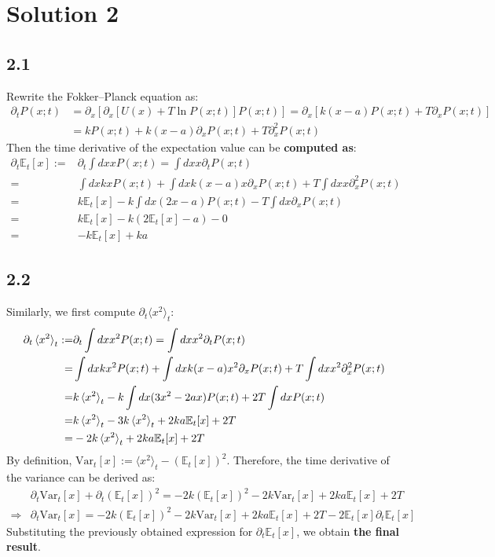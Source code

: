 \documentclass[11pt]{article}
\begin{document}
	\section*{Solution 2}
	\subsection*{2.1}
	Rewrite the Fokker--Planck equation as:
	\[
	\begin{aligned}
		\partial_t P(x;t) &= \partial_x\left[\partial_x\left[U(x) + T\ln P(x;t)\right]P(x;t)\right]=\partial_x\left[k(x-a)P(x;t)+T\partial_xP(x;t)\right]\\
		&=kP(x;t)+k(x-a)\partial_xP(x;t)+T\partial_x^2P(x;t)
	\end{aligned}
	\]
Then the time derivative of the expectation value can be \textbf{computed as}:
	\[
	\begin{aligned}
		\partial_t\mathbb{E}_t[x]:=&\partial_t\int dx xP(x;t)=\int dx x\partial_t P(x;t)\\
		=&\int dx kxP(x;t)+\int dx k(x-a)x\partial_x P(x;t)+T\int dx x\partial^2_x P(x;t)\\
		=&k\mathbb{E}_t[x]-k\int dx\left(2x-a\right)P(x;t)-T\int dx\partial_xP(x;t)\\
		=&k\mathbb{E}_t[x]-k\left(2\mathbb{E}_t[x]-a\right)-0\\
		=&\boxed{-k\mathbb{E}_t[x]+ka}
	\end{aligned}
	\]
	
	\subsection*{2.2}
	
Similarly, we first compute $\partial_t\langle x^2\rangle_t$:
	\[
	\begin{aligned}
		\partial_t\braket{x^2}_t:=&\partial_t\int dx x^2P(x;t)=\int dx x^2 \partial_tP(x;t)\\
		=&\int dx kx^2P(x;t)+\int dx k(x-a)x^2\partial_x P(x;t)+T\int dx x^2\partial^2_x P(x;t)\\
		=&k\braket{x^2}_t-k\int dx (3x^2-2a x) P(x;t)+2T\int dx  P(x;t)\\
		=&k\braket{x^2}_t-3k\braket{x^2}_t+2ka\mathbb{E}_t[x]+2T\\
		=&-2k\braket{x^2}_t+2ka\mathbb{E}_t[x]+2T
	\end{aligned}
	\]
By definition, $\mathrm{Var}_t[x]:=\langle x^2\rangle_t-(\mathbb{E}_t[x])^2$. Therefore, the time derivative of the variance can be derived as:
	\[
	\begin{aligned}
		&\partial_{t}\mathrm{Var}_t[x]+\partial_t(\mathbb{E}_t[x])^2=-2k(\mathbb{E}_t[x])^2-2k\mathrm{Var}_t[x]+2ka\mathbb{E}_t[x]+2T\\
		\Rightarrow&
			\partial_t\mathrm{Var}_t[x]=-2k(\mathbb{E}_t[x])^2-2k\mathrm{Var}_t[x]+2ka\mathbb{E}_t[x]+2T-2\mathbb{E}_t[x]\partial_t\mathbb{E}_t[x]
	\end{aligned}
	\]
	Substituting the previously obtained expression for $\partial_t \mathbb{E}_t[x]$, we obtain \textbf{the final result}.
	
\end{document}

